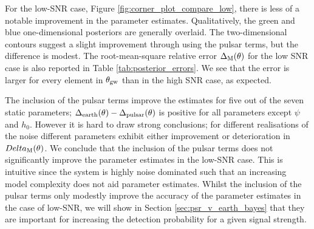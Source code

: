 \documentclass[fleqn,usenatbib,useAMS]{mnras}
\begin{document}
		
For the low-SNR case,  Figure \ref{fig:corner_plot_compare_low}, there is less of a notable improvement in the parameter estimates. Qualitatively, the green and blue one-dimensional posteriors are generally overlaid. The two-dimensional contours suggest a slight improvement through using the pulsar terms, but the difference is modest. The root-mean-square relative error $\Delta_{\rm M}(\theta)$ for the low SNR case is also reported in Table \ref{tab:posterior_errors}. We see that the error is larger for every element in $\theta_{\rm gw}$ than in the high SNR case, as expected. 


The inclusion of the pulsar terms improve the estimates for five out of the seven static parameters; $\Delta_{\rm earth}(\theta)-\Delta_{\rm pulsar}(\theta)$ is positive for all parameters except $\psi$ and $h_0$. However it is hard to draw strong conclusions; for different realisations of the noise different parameters exhibit either improvement or deterioration in $Delta_{\rm M}(\theta)$. We conclude that the inclusion of the pulsar terms does not significantly improve the parameter estimates in the low-SNR case. This is intuitive since the system is highly noise dominated such that an increasing model complexity does not aid parameter estimates. Whilst the inclusion of the pulsar terms only modestly improve the accuracy of the parameter estimates in the case of low-SNR, we will show in Section \ref{sec:psr_v_earth_bayes} that they are important for increasing the detection probability for a given signal strength. \newline 
		
\end{document}
